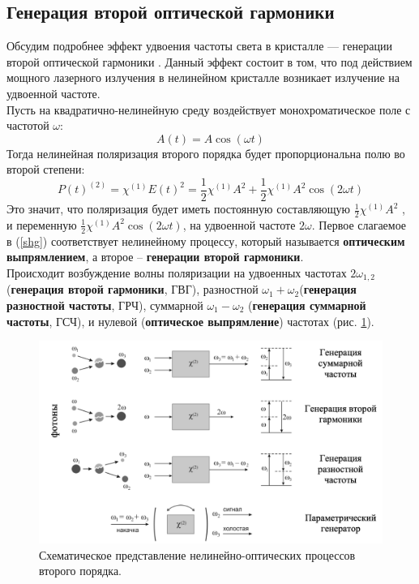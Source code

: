 \subsection*{Генерация второй оптической гармоники} 
\hspace{2mm}
Обсудим подробнее эффект удвоения частоты света в кристалле — генерации второй оптической гармоники \cite{achmanov2}. Данный эффект состоит в том, что под действием мощного лазерного излучения в нелинейном кристалле возникает излучение на удвоенной частоте.
\\
\hspace{2mm}
Пусть на квадратично-нелинейную среду воздействует монохроматическое поле с частотой $\omega$:
\begin{equation}\label{shg:e(t)}
A(t) = A\cos(\omega t)
\end{equation}Тогда нелинейная поляризация второго порядка будет пропорциональна полю во второй степени:
\begin{equation}\label{shg}
P(t)^{(2)} = \chi^{(1)}E(t)^2 = \frac{1}{2}\chi^{(1)}A^2 + \frac{1}{2}\chi^{(1)}A^2\cos(2\omega t)
\end{equation}Это значит, что поляризация будет иметь постоянную составляющую $ \frac{1}{2}\chi^{(1)}A^2$ , и переменную $\frac{1}{2}\chi^{(1)}A^2\cos(2\omega t)$, на удвоенной частоте $2\omega$. Первое слагаемое в (\ref{shg}) соответствует нелинейному процессу, который называется \textbf{оптическим выпрямлением}, а второе – \textbf{генерации второй гармоники}. 
\\
Происходит возбуждение волны поляризации на удвоенных частотах $2\omega_{1,2}$ (\textbf{генерация второй гармоники}, ГВГ), разностной $\omega_1 + \omega_2$(\textbf{генерация разностной частоты}, ГРЧ), суммарной $\omega_1 - \omega_2$ (\textbf{генерация суммарной частоты}, ГСЧ), и нулевой (\textbf{оптическое выпрямление}) частотах (рис. \ref{sghPictr}).
\begin{figure}[h]
	\centering
	\includegraphics[width=0.7\linewidth]{images/shg.png}
	\caption{Схематическое представление нелинейно-оптических процессов второго порядка.}
	\label{sghPictr}
\end{figure}

